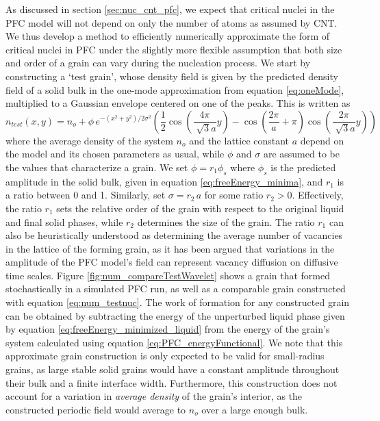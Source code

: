 As discussed in section \ref{sec:nuc_cnt_pfc}, we expect that critical nuclei in the PFC model will not depend on only the number of atoms as assumed by CNT. We thus develop a method to efficiently numerically approximate the form of critical nuclei in PFC under the slightly more flexible assumption that both size and order of a grain can vary during the nucleation process. We start by constructing a `test grain', whose density field is given by the predicted density field of a solid bulk in the one-mode approximation from equation \ref{eq:oneMode}, multiplied to a Gaussian envelope centered on one of the peaks. This is written as
\begin{equation}\label{eq:num_testnuc}
n_{test}(x,y) = n_o + \phi \, e^{-(x^2+y^2)/2\sigma^2} \left(\frac{1}{2}\cos\left(\frac{4\pi}{\sqrt[]{3} a}y\right) - \cos\left(\frac{2\pi}{a}+\pi\right)\cos\left(\frac{2\pi}{\sqrt[]{3} a}y\right) \right)
\end{equation}
where the average density of the system $n_o$ and the lattice constant $a$ depend on the model and its chosen parameters as usual, while $\phi$ and $\sigma$ are assumed to be the values that characterize a grain. We set $\phi=r_1 \phi_s$ where $\phi_s$ is the predicted amplitude in the solid bulk, given in equation \ref{eq:freeEnergy_minima}, and $r_1$ is a ratio between 0 and 1. Similarly, set $\sigma=r_2 \, a$ for some ratio $r_2>0$. Effectively, the ratio $r_1$ sets the relative order of the grain with respect to the original liquid and final solid phases, while $r_2$ determines the size of the grain. The ratio $r_1$ can also be heuristically understood as determining the average number of vacancies in the lattice of the forming grain, as it has been argued \cite{berry14} that variations in the amplitude of the PFC model's field can represent vacancy diffusion on diffusive time scales. Figure \ref{fig:num_compareTestWavelet} shows a grain that formed stochastically in a simulated PFC run, as well as a comparable grain constructed with equation \ref{eq:num_testnuc}. The work of formation for any constructed grain can be obtained by subtracting the energy of the unperturbed liquid phase given by equation \ref{eq:freeEnergy_minimized_liquid} from the energy of the grain's system calculated using equation \ref{eq:PFC_energyFunctional}. We note that this approximate grain construction is only expected to be valid for small-radius grains, as large stable solid grains would have a constant amplitude throughout their bulk and a finite interface width. Furthermore, this construction does not account for a variation in \textit{average density} of the grain's interior, as the constructed periodic field would average to $n_o$ over a large enough bulk.

